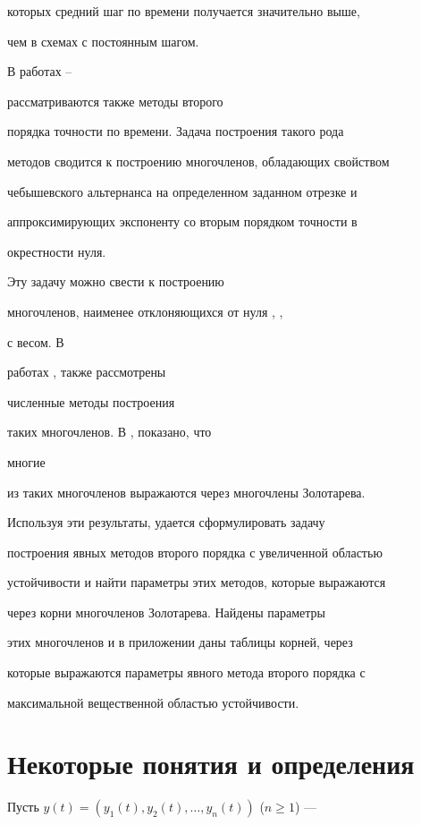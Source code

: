 которых средний шаг по времени получается значительно выше,


чем в схемах с постоянным шагом.


В работах \cite{6}--\cite{12}


рассматриваются также методы второго


порядка точности по времени. Задача построения такого рода


методов сводится к построению многочленов, обладающих свойством


чебышевского альтернанса на определенном заданном отрезке и


аппроксимирующих экспоненту со вторым порядком точности в


окрестности нуля.


Эту задачу можно свести к построению


многочленов, наименее отклоняющихся от нуля \cite{6}, \cite{9},


с весом. В


работах \cite{9}, \cite{12} также рассмотрены


численные методы построения


таких многочленов. В \cite{7}, \cite{13} показано, что


многие


из таких многочленов выражаются через многочлены Золотарева.


Используя эти результаты, удается сформулировать задачу


построения явных методов второго порядка с увеличенной областью


устойчивости и найти параметры этих методов, которые выражаются


через корни многочленов Золотарева. Найдены параметры


этих многочленов и в приложении даны таблицы корней, через


которые выражаются параметры явного метода второго порядка с


максимальной вещественной областью устойчивости.





\section{Некоторые понятия и определения}





Пусть $y(t)=(y_1(t),y_2(t),\dotsc,y_n(t))$ ($n\ge 1$) --- 


